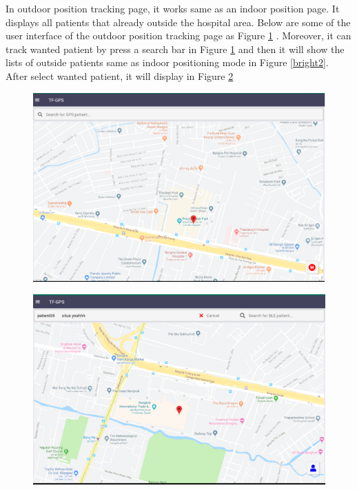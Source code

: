 \newpage
\newpage
In outdoor position tracking page, it works same as an indoor position page. It displays all patients that already outside the hospital area. Below are some of the user interface of the outdoor position tracking page as Figure \ref{bright4} . Moreover, it can track wanted patient by press a search bar in Figure \ref{bright4} and then it will show the lists of outside patients same as indoor positioning mode in Figure \ref{bright2}. After select wanted patient, it will display in Figure \ref{bright5}     
    

\begin{figure}[h]
\centering
\includegraphics[width=\textwidth]{Image/bright4.png}
\caption{}
\label{bright4}
\end{figure}



\begin{figure}[h]
\centering
\includegraphics[width=\textwidth]{Image/bright5.png}
\caption{}
\label{bright5}
\end{figure}

